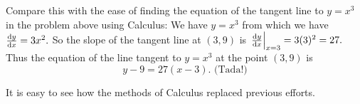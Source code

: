

 Compare this with the ease of finding the equation of the tangent
 line to $y=x^3$ in the problem above using Calculus: We have $y=x^3$
 from which we have $\frac{\text{d}{y}}{\text{d}{x}} = 3x^2.$ So the slope of the tangent
 line at $(3,9)$ is $\left.\frac{\text{d}{y}}{\text{d}{x}}\right|_{x=3} = 3(3)^2=27.$ Thus
 the equation of the line tangent to $y=x^3$ at the point $(3,9)$ is
$$
y-9=27(x-3). \text{ (Tada!)}
$$

It is easy to see how the methods of Calculus replaced previous
efforts.









